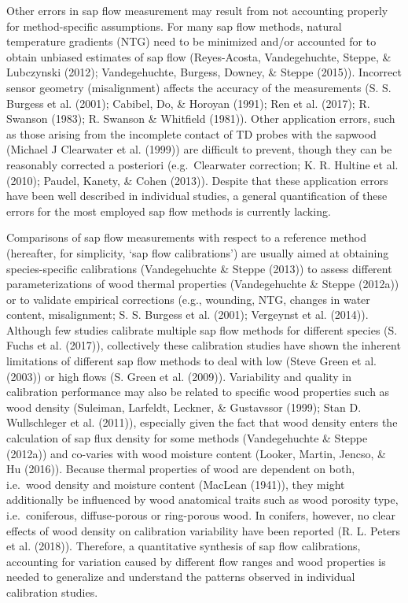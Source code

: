 \documentclass[11pt,twoside]{reedthesis}
\begin{document}
Other errors in sap flow measurement may result from not accounting
properly for method-specific assumptions. For many sap flow methods,
natural temperature gradients (NTG) need to be minimized and/or
accounted for to obtain unbiased estimates of sap flow (Reyes-Acosta,
Vandegehuchte, Steppe, \& Lubczynski (2012); Vandegehuchte, Burgess,
Downey, \& Steppe (2015)). Incorrect sensor geometry (misalignment)
affects the accuracy of the measurements (S. S. Burgess et al. (2001);
Cabibel, Do, \& Horoyan (1991); Ren et al. (2017); R. Swanson (1983); R.
Swanson \& Whitfield (1981)). Other application errors, such as those
arising from the incomplete contact of TD probes with the sapwood
(Michael J Clearwater et al. (1999)) are difficult to prevent, though
they can be reasonably corrected a posteriori (e.g.~Clearwater
correction; K. R. Hultine et al. (2010); Paudel, Kanety, \& Cohen
(2013)). Despite that these application errors have been well described
in individual studies, a general quantification of these errors for the
most employed sap flow methods is currently lacking.\par

Comparisons of sap flow measurements with respect to a reference method
(hereafter, for simplicity, `sap flow calibrations') are usually aimed
at obtaining species-specific calibrations (Vandegehuchte \& Steppe
(2013)) to assess different parameterizations of wood thermal properties
(Vandegehuchte \& Steppe (2012a)) or to validate empirical corrections
(e.g., wounding, NTG, changes in water content, misalignment; S. S.
Burgess et al. (2001); Vergeynst et al. (2014)). Although few studies
calibrate multiple sap flow methods for different species (S. Fuchs et
al. (2017)), collectively these calibration studies have shown the
inherent limitations of different sap flow methods to deal with low
(Steve Green et al. (2003)) or high flows (S. Green et al. (2009)).
Variability and quality in calibration performance may also be related
to specific wood properties such as wood density (Suleiman, Larfeldt,
Leckner, \& Gustavssor (1999); Stan D. Wullschleger et al. (2011)),
especially given the fact that wood density enters the calculation of
sap flux density for some methods (Vandegehuchte \& Steppe (2012a)) and
co-varies with wood moisture content (Looker, Martin, Jencso, \& Hu
(2016)). Because thermal properties of wood are dependent on both,
i.e.~wood density and moisture content (MacLean (1941)), they might
additionally be influenced by wood anatomical traits such as wood
porosity type, i.e.~coniferous, diffuse-porous or ring-porous wood. In
conifers, however, no clear effects of wood density on calibration
variability have been reported (R. L. Peters et al. (2018)). Therefore,
a quantitative synthesis of sap flow calibrations, accounting for
variation caused by different flow ranges and wood properties is needed
to generalize and understand the patterns observed in individual
calibration studies.\par
\end{document}
